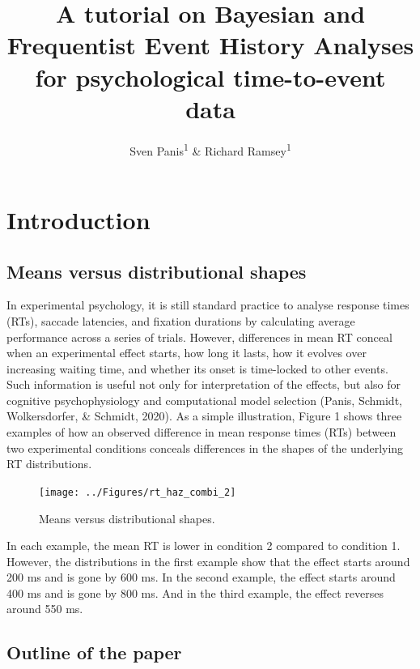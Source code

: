 \documentclass[
  man,floatsintext]{apa6}
\title{A tutorial on Bayesian and Frequentist Event History Analyses for psychological time-to-event data}
\author{Sven Panis\textsuperscript{1} \& Richard Ramsey\textsuperscript{1}}
\date{}
\affiliation{\vspace{0.5cm}\textsuperscript{1} ETH Zürich}
\begin{document}
\maketitle

\section{Introduction}\label{introduction}

\subsection{Means versus distributional shapes}\label{means-versus-distributional-shapes}

In experimental psychology, it is still standard practice to analyse response times (RTs), saccade latencies, and fixation durations by calculating average performance across a series of trials. However, differences in mean RT conceal when an experimental effect starts, how long it lasts, how it evolves over increasing waiting time, and whether its onset is time-locked to other events. Such information is useful not only for interpretation of the effects, but also for cognitive psychophysiology and computational model selection (Panis, Schmidt, Wolkersdorfer, \& Schmidt, 2020).
As a simple illustration, Figure 1 shows three examples of how an observed difference in mean response times (RTs) between two experimental conditions conceals differences in the shapes of the underlying RT distributions.



\begin{figure}[H]

{\centering \texttt{[image: ../Figures/rt\_haz\_combi\_2]} 

}

\caption{Means versus distributional shapes.}\label{fig:plot1}
\end{figure}

In each example, the mean RT is lower in condition 2 compared to condition 1. However, the distributions in the first example show that the effect starts around 200 ms and is gone by 600 ms. In the second example, the effect starts around 400 ms and is gone by 800 ms. And in the third example, the effect reverses around 550 ms.

\subsection{Outline of the paper}\label{outline-of-the-paper}
\end{document}
